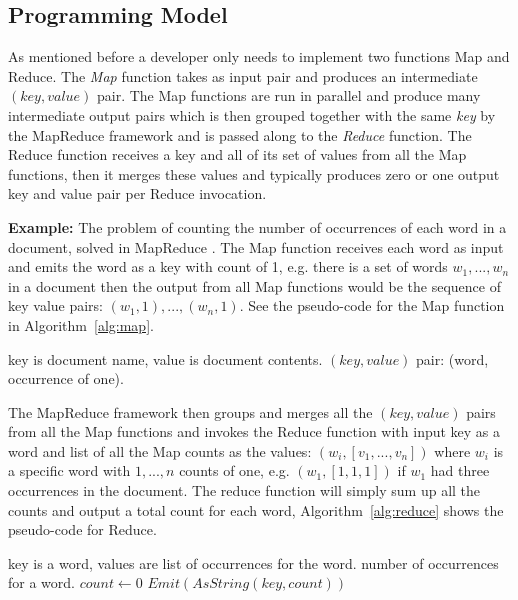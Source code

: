 \subsection{Programming Model}
As mentioned before a developer only needs to implement two functions Map and Reduce. The \textit{Map} function takes as input pair and produces an intermediate $(key,value)$ pair. The Map functions are run in parallel and produce many intermediate output pairs which is then grouped together with the same \textit{key} by the MapReduce framework and is passed along to the \textit{Reduce} function. The Reduce function receives a key and all of its set of values from all the Map functions, then it merges these values and typically produces zero or one output key and value pair per Reduce invocation.

\textbf{Example:} The problem of counting the number of occurrences of each word in a document, solved in MapReduce \citep{Dean:2004}. The Map function receives each word as input and emits the word as a key with count of 1, e.g. there is a set of words $w_1,...,w_n$ in a document then the output from all Map functions would be the sequence of key value pairs: $(w_1,1),...,(w_n,1)$. See the pseudo-code for the Map function in Algorithm~\ref{alg:map}.
\begin{center}
\newcommand{\map}{\ensuremath{\mbox{\sc Map}}}
\begin{algorithm}[h!]
\caption{$\map(key,value)$}\label{alg:map}
\begin{algorithmic}[1]
\REQUIRE key is document name, value is document contents.
\ENSURE $(key,value)$ pair: (word, occurrence of one).
\medskip
{} 
\ENDFOR
\end{algorithmic}
\end{algorithm}
\end{center}
The MapReduce framework then groups and merges all the $(key,value)$ pairs from all the Map functions and invokes the Reduce function with input key as a word and list of all the Map counts as the values: $(w_i,[v_1,...,v_n])$ where $w_i$ is a specific word with $1,...,n$ counts of one, e.g. $(w_1, [1,1,1])$ if $w_1$ had three occurrences in the document. The reduce function will simply sum up all the counts and output a total count for each word, Algorithm~\ref{alg:reduce} shows the pseudo-code for Reduce.
\begin{center}
\newcommand{\reduce}{\ensuremath{\mbox{\sc Reduce}}}
\begin{algorithm}[h!]
\caption{$\reduce(key,values)$}\label{alg:reduce}
\begin{algorithmic}[1]
\REQUIRE key is a word, values are list of occurrences for the word.
\ENSURE number of occurrences for a word.
\STATE $count \leftarrow 0$
\medskip
{} 
\ENDFOR
\STATE $Emit(AsString(key, count))$
\end{algorithmic}
\end{algorithm}
\end{center}
